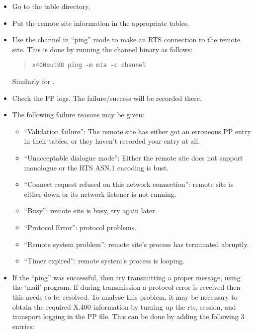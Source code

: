 \begin{itemize}
\item Go to the table directory.
\item Put the remote site information in the appropriate tables. 
\item Use the channel in ``ping'' mode to
make an RTS connection to the remote site. This is done by running the
channel binary as follows:
\begin{quote}\small\begin{verbatim}
x400out88 ping -m mta -c channel
\end{verbatim}\end{quote}
Similarly for .

\item Check the PP logs. The failure/success will be recorded there.

\item The following failure reasons may be given:

\begin{itemize}
\item ``Validation failure'': The remote site has either got 
an erroneous PP entry in their tables, or they haven't recorded 
your entry at all.

\item ``Unacceptable dialogue mode'':  Either the remote site does not 
support monologue or the RTS ASN.1 encoding is bust.

\item ``Connect request refused on this network connection'':
 remote site is either down or its network listener is not running.

\item ``Busy'':  remote site is busy, try again later. 

\item ``Protocol Error'': protocol problems. 

\item ``Remote system problem'': remote site's process has terminated
abruptly.

\item ``Timer expired'': remote system's process is looping.
\end{itemize} 

\item If the ``ping'' was successful, then  
try transmitting a proper message, using the `mail'
program. If during transmission a protocol error is received then this 
needs to be resolved.
To analyse this problem, it may be necessary to obtain the required 
X.400 information by turning up the rts, session, 
and transport logging in the PP  file. This can be done 
by adding the following 3 entries: 

\end{itemize}


